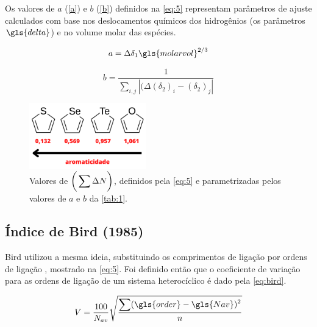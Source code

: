 
Os valores de $a$ (\autoref{a}) e $b$ (\autoref{b}) definidos na \autoref{eq:5} representam parâmetros de ajuste calculados com base nos deslocamentos químicos dos hidrogênios (os parâmetros $\gls{delta}$) e no volume molar das espécies.

\begin{equation}
\label{a}
    a = \Delta \delta_1 {\gls{molarvol}}^{2/3}
\end{equation}

\begin{equation}
\label{b}
    b = \frac{1}{\displaystyle \sum_{i,j} |(\Delta (\delta_2)_i - (\delta_2)_j|}
\end{equation}


\begin{figure}[htb]
	\caption{\label{fig:4} Valores de $\bigg{(} \displaystyle \sum \Delta N \bigg{)}$, definidos pela \autoref{eq:5} e parametrizadas pelos valores de $a$ e $b$ da \autoref{tab:1}.}
	\begin{center}
		\includegraphics[width=0.45\textwidth]{images/aromaticity(1).png}
	\end{center}
\end{figure}

\subsection{Índice de Bird (1985)}

Bird \autocite{Bird1985, Bird1986, Bird1992} utilizou a mesma ideia, substituindo os comprimentos de ligação por ordens de ligação \autocite{Gordy1947}, mostrado na \autoref{eq:5}. Foi definido então que o coeficiente de variação para as ordens de ligação de um sistema heterocíclico é dado pela \autoref{eq:bird}.

\begin{equation}
\label{eq:bird}
    V = \frac{100}{N_{av}} \sqrt{\displaystyle \frac{\displaystyle \sum (\gls{order} - \gls{Nav})^2}{n}}
\end{equation}

